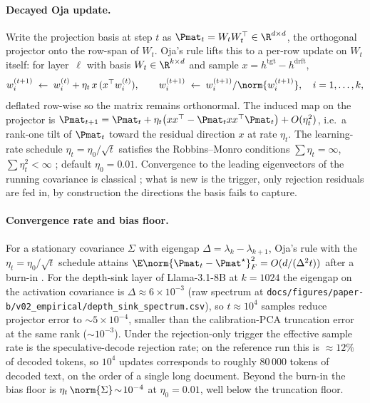 \documentclass[11pt]{article}
\begin{document}
\paragraph{Decayed Oja update.}  Write the projection basis at step $t$ as
$\Pmat_t=W_tW_t^\top\in\R^{d\times d}$, the orthogonal projector onto
the row-span of $W_t$. Oja's rule lifts this to a per-row update on
$W_t$ itself: for layer~$\ell$ with basis $W_t\in\R^{k\times d}$ and
sample $x=h^\text{tgt}-h^\text{drft}$,
\begin{equation}
w_i^{(t+1)} \;\leftarrow\; w_i^{(t)} + \eta_t\,x\,(x^\top w_i^{(t)}),
\qquad w_i^{(t+1)} \;\leftarrow\; w_i^{(t+1)}/\norm{w_i^{(t+1)}},
\quad i=1,\dots,k,
\label{eq:oja}
\end{equation}
deflated row-wise so the matrix remains orthonormal. The induced map on
the projector is
$\Pmat_{t+1}=\Pmat_t+\eta_t\bigl(xx^\top-\Pmat_t xx^\top\Pmat_t\bigr)+O(\eta_t^2)$,
i.e.\ a rank-one tilt of $\Pmat_t$ toward the residual direction $x$ at
rate $\eta_t$. The learning-rate schedule $\eta_t=\eta_0/\sqrt t$
satisfies the Robbins--Monro conditions $\sum\eta_t=\infty$,
$\sum\eta_t^2<\infty$ \cite{robbins1951sa}; default $\eta_0=0.01$.
Convergence to the leading eigenvectors of the running covariance is
classical \cite{oja1982}; what is new is the trigger, only rejection
residuals are fed in, by construction the directions the basis fails to
capture.

\paragraph{Convergence rate and bias floor.}
For a stationary covariance $\Sigma$ with eigengap
$\Delta=\lambda_k-\lambda_{k+1}$, Oja's rule with the
$\eta_t=\eta_0/\sqrt t$ schedule attains
$\E\norm{\Pmat_t-\Pmat^\star}_F^2 = O(d/(\Delta^2 t))$ after a burn-in
\cite{allen2017first,jain2016streaming}. For the depth-sink layer of
Llama-3.1-8B at $k{=}1024$ the eigengap on the activation covariance is
$\Delta\approx 6\times 10^{-3}$ (raw spectrum at
\texttt{docs/figures/paper-b/v02\_empirical/depth\_sink\_spectrum.csv}),
so $t\!\approx\!10^4$ samples reduce projector error to
$\sim 5\times 10^{-4}$, smaller than the calibration-PCA truncation
error at the same rank ($\sim 10^{-3}$). Under the rejection-only
trigger the effective sample rate is the speculative-decode rejection
rate; on the reference run this is $\approx 12\%$ of decoded tokens, so
$10^4$ updates corresponds to roughly $80\,000$ tokens of decoded text,
on the order of a single long document. Beyond the burn-in the bias
floor is $\eta_t\,\norm{\Sigma}\!\sim\!10^{-4}$ at $\eta_0{=}0.01$, well
below the truncation floor.
\end{document}
